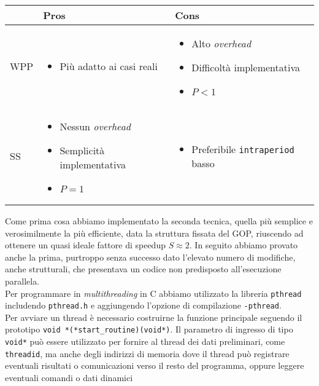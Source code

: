\begin{center}
	\begin{tabularx}{\textwidth}{>{}X|>{}X|>{}X}
		
		    & Pros & Cons \\ \hline
		WPP & 
		    \begin{itemize}
		    	\item Più adatto ai casi reali
			\end{itemize}
			&
			\begin{itemize}
				\item Alto \emph{overhead}
				\item Difficoltà implementativa
				\item $P < 1$
			\end{itemize} \\ \hline
		SS &
		   \begin{itemize}
			   	\item Nessun \emph{overhead}
			   	\item Semplicità implementativa
			   	\item $P = 1$
		   \end{itemize}
		   &
		   \begin{itemize}
		   	    \item Preferibile \verb|intraperiod| basso
		   \end{itemize}
	\end{tabularx}
\end{center}
Come prima cosa abbiamo implementato la seconda tecnica, quella più 
semplice e verosimilmente la più efficiente, data la struttura fissata del GOP, 
riuscendo ad ottenere un quasi ideale fattore di speedup $S \approx 2$. In 
seguito abbiamo provato anche la prima, purtroppo senza successo dato l'elevato 
numero di modifiche, anche strutturali, che presentava un codice non 
predisposto all'esecuzione parallela.
\\Per programmare in \emph{multithreading} in C abbiamo utilizzato la libreria 
\verb|pthread| includendo \verb|pthread.h| e aggiungendo l'opzione di 
compilazione \verb|-pthread|.\\
Per avviare un thread è necessario costruirne la funzione principale seguendo 
il prototipo \verb|void *(*start_routine)(void*)|. Il parametro di ingresso di 
tipo \verb|void*| può essere utilizzato per fornire al thread dei dati 
preliminari, come \verb|threadid|, ma anche degli indirizzi di 
memoria dove il thread può registrare eventuali risultati o comunicazioni verso 
il resto del programma, oppure leggere eventuali comandi o dati dinamici 
